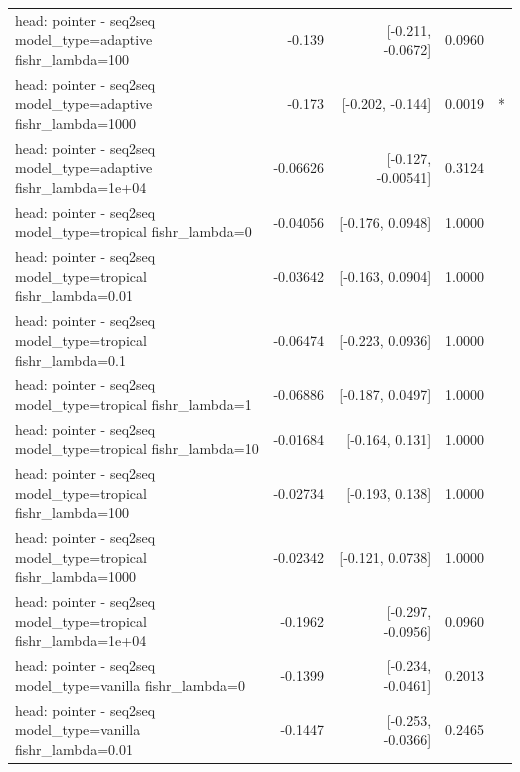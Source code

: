\documentclass[10pt]{article}
\makeatletter
\newcommand{\stackcell}[1]{\begin{tabular}[t]{@{}l@{}}#1\end{tabular}}
\makeatother
\begin{document}
{\begin{longtable}{lrrrl}
\stackcell{head: pointer - seq2seq\\\footnotesize model\_type=adaptive fishr\_lambda=100 } & -0.139 & [-0.211, -0.0672] & 0.0960 & \\
\stackcell{head: pointer - seq2seq\\\footnotesize model\_type=adaptive fishr\_lambda=1000 } & -0.173 & [-0.202, -0.144] & 0.0019 & *\\
\stackcell{head: pointer - seq2seq\\\footnotesize model\_type=adaptive fishr\_lambda=1e+04 } & -0.06626 & [-0.127, -0.00541] & 0.3124 & \\
\stackcell{head: pointer - seq2seq\\\footnotesize model\_type=tropical fishr\_lambda=0 } & -0.04056 & [-0.176, 0.0948] & 1.0000 & \\
\stackcell{head: pointer - seq2seq\\\footnotesize model\_type=tropical fishr\_lambda=0.01 } & -0.03642 & [-0.163, 0.0904] & 1.0000 & \\
\stackcell{head: pointer - seq2seq\\\footnotesize model\_type=tropical fishr\_lambda=0.1 } & -0.06474 & [-0.223, 0.0936] & 1.0000 & \\
\stackcell{head: pointer - seq2seq\\\footnotesize model\_type=tropical fishr\_lambda=1 } & -0.06886 & [-0.187, 0.0497] & 1.0000 & \\
\stackcell{head: pointer - seq2seq\\\footnotesize model\_type=tropical fishr\_lambda=10 } & -0.01684 & [-0.164, 0.131] & 1.0000 & \\
\stackcell{head: pointer - seq2seq\\\footnotesize model\_type=tropical fishr\_lambda=100 } & -0.02734 & [-0.193, 0.138] & 1.0000 & \\
\stackcell{head: pointer - seq2seq\\\footnotesize model\_type=tropical fishr\_lambda=1000 } & -0.02342 & [-0.121, 0.0738] & 1.0000 & \\
\stackcell{head: pointer - seq2seq\\\footnotesize model\_type=tropical fishr\_lambda=1e+04 } & -0.1962 & [-0.297, -0.0956] & 0.0960 & \\
\stackcell{head: pointer - seq2seq\\\footnotesize model\_type=vanilla fishr\_lambda=0 } & -0.1399 & [-0.234, -0.0461] & 0.2013 & \\
\stackcell{head: pointer - seq2seq\\\footnotesize model\_type=vanilla fishr\_lambda=0.01 } & -0.1447 & [-0.253, -0.0366] & 0.2465 & \\

\end{longtable}}
\end{document}
